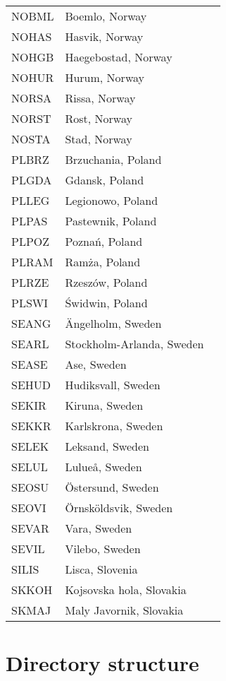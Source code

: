 \begin{longtable}[htb]{lll}
NOBML & Boemlo, Norway \\
NOHAS & Hasvik, Norway \\
NOHGB & Haegebostad, Norway \\
NOHUR & Hurum, Norway \\
NORSA & Rissa, Norway \\
NORST & Rost, Norway \\
NOSTA & Stad, Norway \\
PLBRZ & Brzuchania, Poland \\
PLGDA & Gdansk, Poland \\
PLLEG & Legionowo, Poland \\
PLPAS & Pastewnik, Poland \\
PLPOZ & Pozna\'{n}, Poland \\
PLRAM & Ram\.{z}a, Poland \\
PLRZE & Rzesz\'{o}w, Poland \\
PLSWI & \'{S}widwin, Poland \\
SEANG & \"{A}ngelholm, Sweden \\
SEARL & Stockholm-Arlanda, Sweden \\
SEASE & Ase, Sweden \\
SEHUD & Hudiksvall, Sweden \\
SEKIR & Kiruna, Sweden \\
SEKKR & Karlskrona, Sweden \\
SELEK & Leksand, Sweden \\
SELUL & Lulue\r{a}, Sweden \\
SEOSU & \"{O}stersund, Sweden \\
SEOVI & \"{O}rnsk\"{o}ldsvik, Sweden \\
SEVAR & Vara, Sweden \\
SEVIL & Vilebo, Sweden \\
SILIS & Lisca, Slovenia \\
SKKOH & Kojsovska hola, Slovakia \\
SKMAJ & Maly Javornik, Slovakia\\
\end{longtable}

\section{Directory structure}

